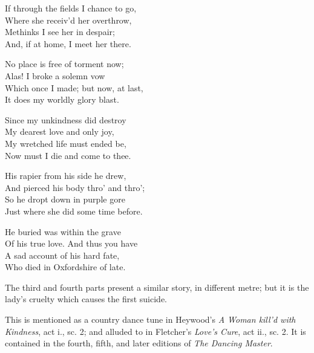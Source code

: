 \begin{dcverse}
If through the fields I chance to go,\\
Where she receiv’d her overthrow,\\
Methinks I see her in despair;\\
And, if at home, I meet her there.

No place is free of torment now;\\
Alas! I broke a solemn vow\\
Which once I made; but now, at last,\\
It does my worldly glory blast.

Since my unkindness did destroy\\
My dearest love and only joy,\\
My wretched life must ended be,\\
Now must I die and come to thee.

His rapier from his side he drew,\\
And pierced his body thro’ and thro’;\\
So he dropt down in purple gore\\
Just where she did some time before.

He buried was within the grave\\
Of his true love. And thus you have\\
A sad account of his hard fate,\\
Who died in Oxfordshire of late.
\end{dcverse}

The third and fourth parts present a similar story, in different metre; but
it is the lady’s cruelty which causes the first suicide.

\pagebreak


This is mentioned as a country dance tune in Heywood’s \textit{A Woman kill’d with
Kindness}, act i., sc. 2; and alluded to in Fletcher’s \textit{Love’s Cure}, act ii., sc. 2.
It is contained in the fourth, fifth, and later editions of \textit{The Dancing Master}.




